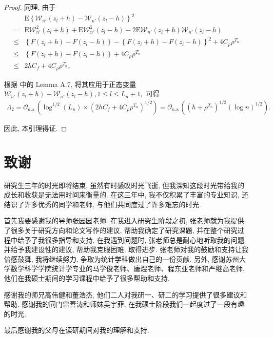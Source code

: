 \documentclass[a4paper,openay,14pt]{ctexbook}
\numberwithin{equation}{section}
\numberwithin{lem}{section}
\begin{document}
\begin{proof}
同理, 由于
\begin{align*}
    &\mathrm{E}\left\{\mathcal{W}_{n'}(z_l+h) - \mathcal{W}_{n'}(z_l-h)\right\}^2\\
    =&
    \mathrm{E} \mathcal{W}_{n'}^{2}(z_l+h)
    +\mathrm{E} \mathcal{W}_{n'}^{2}(z_l-h)
    -2\mathrm{E} \mathcal{W}_{n'}(z_l+h)\mathcal{W}_{n'}(z_l-h)\\
    \le &
    \left\{F(z_l+h) - F(z_l-h)\right\}
    - \left\{F(z_l+h) - F(z_l-h)\right\}^2
    +4C_{\rho}{\rho}^{T_n}\\
    \leq&
    \left\{F(z_l+h) - F(z_l-h)\right\}
    +4C_{\rho}{\rho}^{T_n}\\
    \leq &
    2hC_f+4C_{\rho}{\rho}^{T_n},
\end{align*}

根据 \cite{wang2022oracle} 中的 Lemma A.7, 将其应用于正态变量
$\mathcal{W}_{n'}(z_l+h) - \mathcal{W}_{n'}(z_l-h), 1\le l\le L_n+1,$
可得
\begin{align*}
\Lambda_2
=
\mathcal{O}_{a.s.}\left(
\log^{1/2}(L_n)
\times
(2hC_f+4C_{\rho}{\rho}^{T_n})^{1/2}
\right)
=
\mathcal{O}_{a.s.}\left(
\left(h+\rho^{T_n}\right)^{1/2}
\left(\log n\right)^{1/2}
\right).
\end{align*}

因此, 本引理得证.

\end{proof}


\clearpage
{}
\chapter*{致谢}
\thispagestyle{fancy}
研究生三年的时光即将结束,  虽然有时感叹时光飞逝,  但我深知这段时光带给我的成长和收获是无法用时间来衡量的. 在这三年中,  我不仅积累了丰富的专业知识,  还结识了许多优秀的同学和老师,  与他们共同度过了许多难忘的时光. 

首先我要感谢我的导师张园园老师. 在我进入研究生阶段之初,  张老师就为我提供了很多关于研究方向和论文写作的建议,  帮助我确定了研究课题,  并在整个研究过程中给予了我很多指导和支持. 在我遇到问题时,  张老师总是耐心地听取我的问题并给予我建设性的建议,  帮助我克服困难,  取得进步. 张老师对我的鼓励和支持让我倍感鼓舞,  我将继续努力,  争取为统计学科做出自己的一份贡献. 另外, 感谢苏州大学数学科学学院统计学专业的马学俊老师、唐煜老师、程东亚老师和严继高老师, 他们在我硕士期间的学习课程中给予了很多帮助和支持. 

感谢我的师兄高伟健和董浩杰, 他们二人对我研一、研二的学习提供了很多建议和帮助. 感谢我的同门雷善涛和师妹吴宇菲,  在我硕士阶段我们一起度过了一段有趣的时光. 

最后感谢我的父母在读研期间对我的理解和支持.

\newpage
{}
\end{document}
